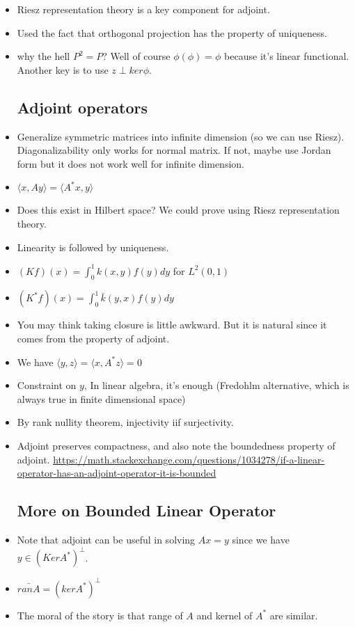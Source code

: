 \documentclass{article}
\theoremstyle{remark}
\begin{document}
\begin{itemize}
\item Riesz representation theory is a key component for adjoint.
\item Used the fact that orthogonal projection has the property of uniqueness.
\item why the hell $P^2=P$? Well of course $\phi(\phi)=\phi$ because it's linear functional. Another key is to use $z\perp ker\phi$.











\subsection*{Adjoint operators}
\item Generalize symmetric matrices into infinite dimension (so we can use Riesz). Diagonalizability only works for normal matrix. If not, maybe use Jordan form but it does not work well for infinite dimension.
\item $\langle x,Ay\rangle=\langle A^*x,y\rangle$
\item Does this exist in Hilbert space? We could prove using Riesz representation theory.
\item Linearity is followed by uniqueness.
\item $(Kf)(x)=\int^1_0 k(x,y)f(y)dy$ for $L^2(0,1)$
\item $(K^* f)(x)=\int ^1_0 \bar k(y,x)f(y)dy$
\item You may think taking closure is little awkward. But it is natural since it comes from the property of adjoint.
\item We have $\langle y,z\rangle=\langle x,A^*z\rangle=0$
\item Constraint on $y$, In linear algebra, it's enough (Fredohlm alternative, which is always true in finite dimensional space)
\item By rank nullity theorem, injectivity iif surjectivity.
\item Adjoint preserves compactness, and also note the boundedness property of adjoint.
\url{https://math.stackexchange.com/questions/1034278/if-a-linear-operator-has-an-adjoint-operator-it-is-bounded}




\subsection*{More on Bounded Linear Operator}
\item Note that adjoint can be useful in solving $Ax=y$ since we have $y\in(Ker A^*)^\perp$.
\item $\bar{ran A}=(ker A^*)^\perp$
\item The moral of the story is that range of $A$ and kernel of $A^*$ are similar.



\end{itemize}
\end{document}
